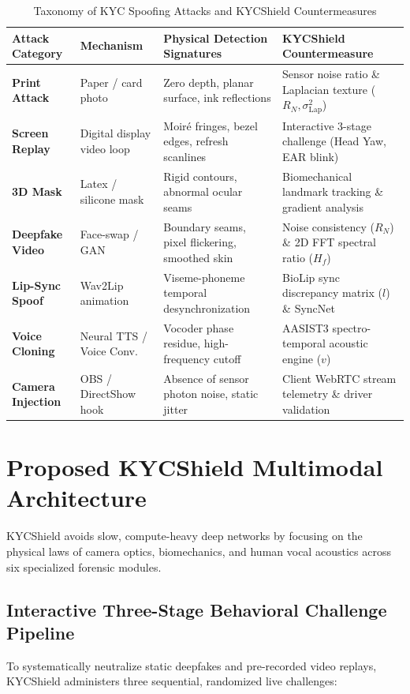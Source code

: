 \documentclass[conference]{IEEEtran}
\begin{document}
\begin{table}[t]
\centering
\caption{Taxonomy of KYC Spoofing Attacks and KYCShield Countermeasures}
\label{tab:taxonomy}
\begin{tabular}{llll}
\toprule
\textbf{Attack Category} & \textbf{Mechanism} & \textbf{Physical Detection Signatures} & \textbf{KYCShield Countermeasure} \\
\midrule
\textbf{Print Attack} & Paper / card photo & Zero depth, planar surface, ink reflections & Sensor noise ratio \& Laplacian texture ($R_N, \sigma^2_{\text{Lap}}$) \\
\textbf{Screen Replay} & Digital display video loop & Moir\'e fringes, bezel edges, refresh scanlines & Interactive 3-stage challenge (Head Yaw, EAR blink) \\
\textbf{3D Mask} & Latex / silicone mask & Rigid contours, abnormal ocular seams & Biomechanical landmark tracking \& gradient analysis \\
\textbf{Deepfake Video} & Face-swap / GAN & Boundary seams, pixel flickering, smoothed skin & Noise consistency ($R_N$) \& 2D FFT spectral ratio ($H_f$) \\
\textbf{Lip-Sync Spoof} & Wav2Lip animation & Viseme-phoneme temporal desynchronization & BioLip sync discrepancy matrix ($l$) \& SyncNet \\
\textbf{Voice Cloning} & Neural TTS / Voice Conv. & Vocoder phase residue, high-frequency cutoff & AASIST3 spectro-temporal acoustic engine ($v$) \cite{borodin2024aasist3} \\
\textbf{Camera Injection} & OBS / DirectShow hook & Absence of sensor photon noise, static jitter & Client WebRTC stream telemetry \& driver validation \cite{iso30107} \\
\bottomrule
\end{tabular}
\end{table}

\section{Proposed KYCShield Multimodal Architecture}
KYCShield avoids slow, compute-heavy deep networks by focusing on the physical laws of camera optics, biomechanics, and human vocal acoustics across six specialized forensic modules.

\subsection{Interactive Three-Stage Behavioral Challenge Pipeline}
To systematically neutralize static deepfakes and pre-recorded video replays, KYCShield administers three sequential, randomized live challenges:
\end{document}
